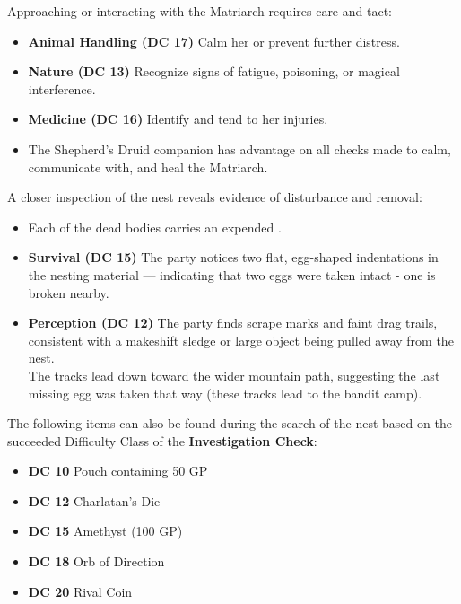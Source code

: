 {\entryfont\noindent Approaching or interacting with the Matriarch requires care and tact:
\begin{itemize}
	\item \textbf{Animal Handling (DC 17)} Calm her or prevent further distress.
	\item \textbf{Nature (DC 13)} Recognize signs of fatigue, poisoning, or magical interference.
	\item \textbf{Medicine (DC 16)} Identify and tend to her injuries.
	\item The Shepherd's Druid companion has advantage on all checks made to calm, communicate with, and heal the Matriarch.
\end{itemize}
A closer inspection of the nest reveals evidence of disturbance and removal:
\begin{itemize}
	\item Each of the dead bodies carries an expended \hyperref[mi:RabbitsFoot]{}.
	\item \textbf{Survival (DC 15)} The party notices two flat, egg-shaped indentations in the nesting material — indicating that two eggs were taken intact - one is broken nearby.
	\item \textbf{Perception (DC 12)} The party finds scrape marks and faint drag trails, consistent with a makeshift sledge or large object being pulled away from the nest.\\
	The tracks lead down toward the wider mountain path, suggesting the last missing egg was taken that way (these tracks lead to the bandit camp).
\end{itemize}
The following items can also be found during the search of the nest based on the succeeded Difficulty Class of the \textbf{Investigation Check}:
\begin{itemize}
	\item \textbf{DC 10} Pouch containing 50 GP
	\item \textbf{DC 12} Charlatan's Die
	\item \textbf{DC 15} Amethyst (100 GP)
	\item \textbf{DC 18} Orb of Direction
	\item \textbf{DC 20} Rival Coin
\end{itemize}}

